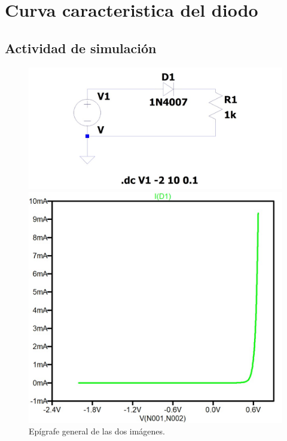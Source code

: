 \documentclass[chaptersright]{informeutn}
\begin{document}
\chapter{Curva caracteristica del diodo}

  \section{Actividad de simulación}
  
 
\begin{figure}[h]
  \centering
  \begin{minipage}{0.45\textwidth}
    \centering
    \includegraphics[width=\linewidth]{pictures/curva_diodo_silicio_circuito.jpeg}
  \end{minipage}
  \hfill
  \begin{minipage}{0.45\textwidth}
    \centering
    \includegraphics[width=\linewidth]{pictures/curva_diodo_silicio_grafico.jpeg}
  \end{minipage}

  \vspace{0.5cm}
  
  \caption{Epígrafe general de las dos imágenes.}
\end{figure}
\end{document}
